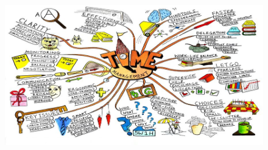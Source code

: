 \documentclass{article}
\begin{document}
\newpage
\begin{landscape} %
\centering %
\begin{figure} %
\includegraphics[scale=3]{mindmap}
\end{figure}
\end{landscape}
\end{document}
